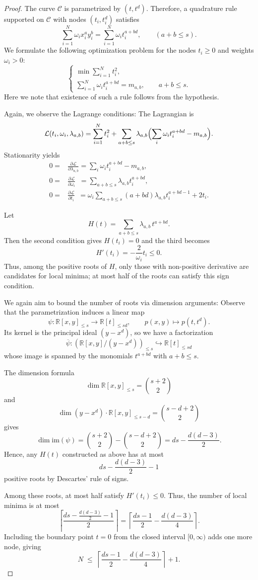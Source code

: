\documentclass[10pt,a4paper]{amsart}
\newcommand{\R}{\mathbb{R}}
\begin{document}
 \begin{proof}

The curve $\mathcal C$ is parametrized by $(t,t^d)$.  
Therefore, a quadrature rule supported on $\mathcal C$ with nodes $(t_i,t_i^d)$ satisfies
\[
\sum_{i=1}^N \omega_i x_i^a y_i^b = \sum_{i=1}^N \omega_i t_i^{a+bd},
\qquad (a+b \le s).
\]
We formulate the following optimization problem for the nodes $t_i \ge 0$ and weights $\omega_i > 0$:
\[
\begin{cases}
\min \sum_{i=1}^N t_i^2,\\[2pt]
\sum_{i=1}^N \omega_i t_i^{a+bd} = m_{a,b}, \qquad a+b \le s.
\end{cases}
\]
Here we note that  existence of such a rule follows from the hypothesis.

Again, we observe the Lagrange conditions: 
The Lagrangian is  
\[
\mathcal L(t_i,\omega_i,\lambda_{a,b})
= \sum_{i=1}^N t_i^2
+ \sum_{a+b \le s} \lambda_{a,b}\Bigl(\sum_i \omega_i t_i^{a+bd} - m_{a,b}\Bigr).
\]
Stationarity yields
\begin{align*}
0=&\frac{\partial \mathcal L}{\partial \lambda_{a,b}} = \sum_i \omega_i t_i^{a+bd}-m_{a,b},\\
0=&\frac{\partial \mathcal L}{\partial \omega_i}\phantom{a} = \sum_{a+b\le s} \lambda_{a,b}t_i^{a+bd},\\
0=&\frac{\partial \mathcal L}{\partial t_i}\phantom{a} = \omega_i\sum_{a+b\le s}(a+bd)\lambda_{a,b}t_i^{a+bd-1}+2t_i.
\end{align*}

Let  
\[
H(t) = \sum_{a+b\le s} \lambda_{a,b}\, t^{a+bd}.
\]
Then the second condition gives $H(t_i)=0$ and the third becomes
\[
H'(t_i) = -\frac{2}{\omega_i} t_i \le 0.
\]
Thus, among the positive roots of $H$, only those with non-positive derivative are candidates for local minima; at most half of the roots can satisfy this sign condition.

We again aim to bound the number of roots via dimension arguments:  Observe that the parametrization induces a linear map
\[
\psi:\R[x,y]_{\le s} \longrightarrow \R[t]_{\le sd},
\qquad p(x,y)\longmapsto p(t,t^d).
\]
Its kernel is the principal ideal $(y-x^d)$, so we have a factorization  
\[
\overline{\psi}:(\R[x,y]/(y-x^d))_{\le s} \hookrightarrow \R[t]_{\le sd}
\]
whose image is spanned by the monomials $t^{a+bd}$ with $a+b \le s$.  

The dimension formula
\[
\dim \R[x,y]_{\le s} = {s+2\choose 2}
\]
and
\[
\dim (y-x^d)\cdot \R[x,y]_{\le s-d} = {s-d+2\choose 2}
\]
gives
\[
\dim \mathrm{im}(\psi)
= {s+2\choose 2}-{s-d+2\choose 2}
= ds - \frac{d(d-3)}{2}.
\]
Hence, any $H(t)$ constructed as above has at most  
\[
ds - \frac{d(d-3)}{2} - 1
\]
positive roots by Descartes' rule of signs.
       
Among these roots, at most half satisfy $H'(t_i)\le 0$.  
Thus, the number of local minima is at most
\[
\left\lceil \frac{ds - \frac{d(d-3)}{2} - 1}{2}\right\rceil
= \left\lceil \frac{ds-1}{2}-\frac{d(d-3)}{4}\right\rceil.
\]
Including the boundary point $t=0$ from the closed interval $[0,\infty)$ adds one more node, giving
\[
N \;\le\; \left\lceil \frac{ds-1}{2}-\frac{d(d-3)}{4} \right\rceil + 1.    \]
    


 \end{proof}
\end{document}
